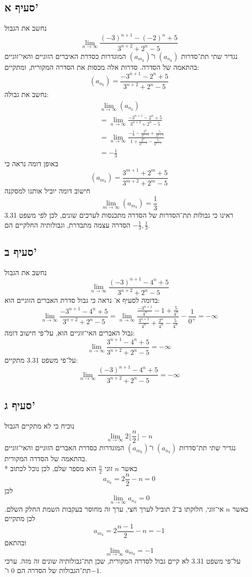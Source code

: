 \documentclass[a4paper]{article}
\begin{document}
\subsection{סעיף א'}
נחשב את הגבול
\[
	\lim_{n \to \infty}
	\frac{{(-3)}^{n + 1} - {(-2)}^n + 5}{3^{n + 2} + 2^n - 5}
\]
נגדיר שתי תת־סדרות $(a_{n_k})$ ו־$(a_{m_k})$
המוגדרות כסדרת האיברים הזוגיים והאי־זוגיים בהתאמה של הסדרה.
סדרות אלה מכסות את הסדרה המקורית, ומתקיים:
\[
	(a_{n_k}) = \frac{-3^{n + 1} - 2^n + 5}{3^{n + 2} + 2^n - 5}
\]
נחשב את גבולה:
\begin{align*}
	& \lim_{n \to \infty} (a_{n_k}) \\
	& = \lim_{n \to \infty} \frac{-3^{n + 1} - 2^n + 5}{3^{n + 2} + 2^n - 5} \\
	& = \lim_{n \to \infty}
	\frac{-\frac{1}{3} - \frac{2^n}{3^{n + 2}} + \frac{5}{3^{n+2}}}
	{1 + \frac{2^n}{3^{n + 2}} - \frac{5}{3^{n+2}}} \\
	& = - \frac{1}{3}
\end{align*}
באופן דומה נראה כי
\[
	(a_{m_k}) = \frac{3^{m + 1} + 2^m + 5}{3^{m + 2} + 2^m - 5}
\]
חישוב דומה יוביל אותנו למסקנה
\[
	\lim_{m \to \infty} (a_{m_k}) = \frac{1}{3}
\]
ראינו כי גבולות תת־הסדרות של הסדרה מתכנסות לערכים שונים,
לכן לפי משפט 3.31 הסדרה עצמה מתבדרת,
וגבולותיה החלקיים הם $-\frac{1}{3}, \frac{1}{3}$.

\subsection{סעיף ב'}
נחשב את הגבול
\[
	\lim_{n \to \infty}
	\frac{{(-3)}^{n + 1} - 4^n + 5}{3^{n + 2} + 2^n - 5}
\]
בדומה לסעיף א' נראה כי גבול סדרת האברים הזוגיים הוא:
\[
	\lim_{n \to \infty}
	\frac{-3^{n + 1} - 4^n + 5}{3^{n + 2} + 2^n - 5}
	= \lim_{n \to \infty}
	\frac{\frac{-3^{n + 1}}{4^n} - 1 + \frac{5}{4^n}}
	{\frac{3^{n + 2}}{4^n} + \frac{2^n}{4^n} - \frac{5}{4^n}}
	-\frac{1}{0^+}
	= - \infty
\]
גבול האברים האי־זוגיים הוא, על־פי חישוב דומה:
\[
	\lim_{n \to \infty}
	\frac{3^{n + 1} - 4^n + 5}{3^{n + 2} + 2^n - 5}
	= - \infty
\]
על־פי משפט 3.31 מתקיים:
\[
	\lim_{n \to \infty}
	\frac{{(-3)}^{n + 1} - 4^n + 5}{3^{n + 2} + 2^n - 5}
	= - \infty
\]

\subsection{סעיף ג'}
נוכיח כי לא מתקיים הגבול
\[
	\lim_{n \to \infty} 2 \lfloor \frac{n}{2} \rfloor - n
\]
נגדיר שתי תת־סדרות $(a_{n_k})$ ו־$(a_{m_k})$
המוגדרות כסדרת האברים הזוגיים והאי־זוגיים בהתאמה של הסדרה המקורית. \\*
כאשר $n$ זוגי $\frac{n}{2}$ הוא מספר שלם, לכן נוכל לכתוב
\[
	a_{n_k} = 2 \frac{n}{2} - n = 0
\]
לכן
\[
	\lim_{n \to \infty}a_{n_k} = 0
\]
כאשר $n$ אי־זוגי, חלוקתו ב־$2$ תוביל לערך חצי,
ערך זה מחוסר בעקבות השמת החלק השלם.
לכן מתקיים
\[
	a_{m_k} = 2 \frac{n - 1}{2} - n = -1
\]
ובהתאם
\[
	\lim_{m \to \infty}a_{m_k} = -1
\]
על־פי משפט 3.31 לא קיים גבול לסדרה המקורית, שכן תת־גבולותיה שונים זה מזה.
ערכי תת־הגבולות של הסדרה הם $0$ ו־$-1$.
\end{document}
